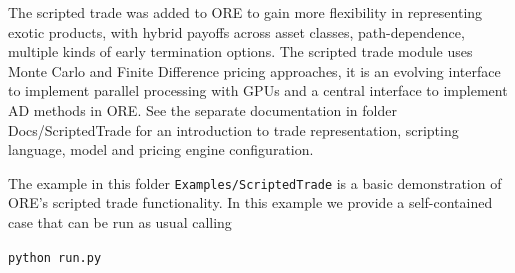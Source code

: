 The scripted trade was added to ORE to gain more flexibility in representing exotic products, with hybrid payoffs across
asset classes, path-dependence, multiple kinds of early termination options. The scripted trade module uses Monte Carlo and
Finite Difference pricing approaches, it is an evolving interface to implement parallel processing with GPUs and a central
interface to implement AD methods in ORE. See the separate documentation in folder Docs/ScriptedTrade for an introduction to trade
representation, scripting language, model and pricing engine configuration. 

\medskip
The example in this folder {\tt Examples/ScriptedTrade} is a basic demonstration of ORE's scripted trade functionality.
In this example we provide a self-contained case that can be run as usual calling

\medskip
\centerline{\tt python run.py}

\medskip

